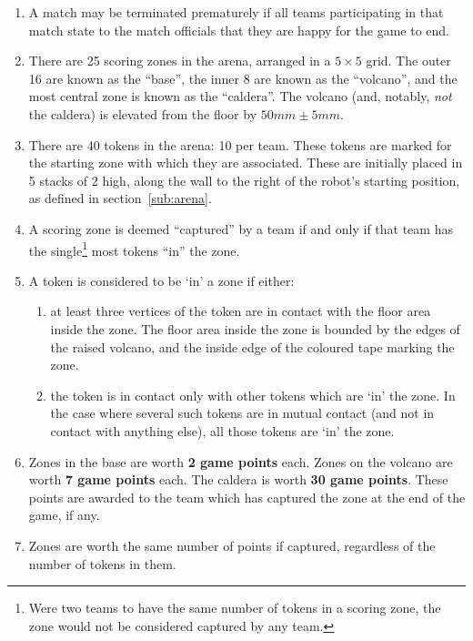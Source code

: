 \begin{enumerate}
\item A match may be terminated prematurely if all teams participating in that match state to the match officials that they are happy for the game to end.

\item There are 25 scoring zones in the arena, arranged in a $5\times5$ grid. The outer 16 are known as the ``base'', the inner 8 are known as the ``volcano'', and the most central zone is known as the ``caldera''. The volcano (and, notably, \emph{not} the caldera) is elevated from the floor by $50 mm \pm 5 mm$.

\item There are 40 tokens in the arena: 10 per team. These tokens are marked for the starting zone with which they are associated. These are initially placed in 5 stacks of 2 high, along the wall to the right of the robot's starting position, as defined in section~\ref{sub:arena}.

\item A scoring zone is deemed ``captured'' by a team if and only if that team has the single\footnote{Were two teams to have the same number of tokens in a scoring zone, the zone would not be considered captured by any team.} most tokens ``in'' the zone.

\item A token is considered to be `in' a zone if either:
\begin{enumerate}
  \item at least three vertices of the token are in contact with the floor area inside the zone. The floor area inside the zone is bounded by the edges of the raised volcano, and the inside edge of the coloured tape marking the zone.
  \item the token is in contact only with other tokens which are `in' the zone. In the case where several such tokens are in mutual contact (and not in contact with anything else), all those tokens are `in' the zone.
\end{enumerate}

\item Zones in the base are worth \textbf{2 game points} each. Zones on the volcano are worth \textbf{7 game points} each. The caldera is worth \textbf{30 game points}. These points are awarded to the team which has captured the zone at the end of the game, if any.

\item Zones are worth the same number of points if captured, regardless of the number of tokens in them.


\end{enumerate}

